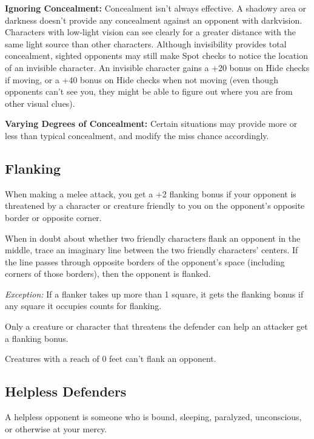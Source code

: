 \textbf{Ignoring Concealment:} Concealment isn't always effective. A shadowy area 
or darkness doesn't provide any concealment against an opponent with darkvision. 
Characters with low-light vision can see clearly for a greater distance with the 
same light source than other characters. Although invisibility provides total concealment, 
sighted opponents may still make Spot checks to notice the location of an invisible 
character. An invisible character gains a +20 bonus on Hide checks if moving, or 
a +40 bonus on Hide checks when not moving (even though opponents can't see you, 
they might be able to figure out where you are from other visual clues).

\textbf{Varying Degrees of Concealment:} Certain situations may provide more or 
less than typical concealment, and modify the miss chance accordingly.

\subsection{Flanking}

When making a melee attack, you get a +2 flanking bonus if your opponent is threatened 
by a character or creature friendly to you on the opponent's opposite border or 
opposite corner.

When in doubt about whether two friendly characters flank an opponent in the middle, 
trace an imaginary line between the two friendly characters' centers. If the line 
passes through opposite borders of the opponent's space (including corners of those 
borders), then the opponent is flanked.

\textit{Exception:} If a flanker takes up more than 1 square, it gets the flanking 
bonus if any square it occupies counts for flanking.

Only a creature or character that threatens the defender can help an attacker get 
a flanking bonus.

Creatures with a reach of 0 feet can't flank an opponent.

\subsection{Helpless Defenders}

A helpless opponent is someone who is bound, sleeping, paralyzed, unconscious, 
or otherwise at your mercy.

